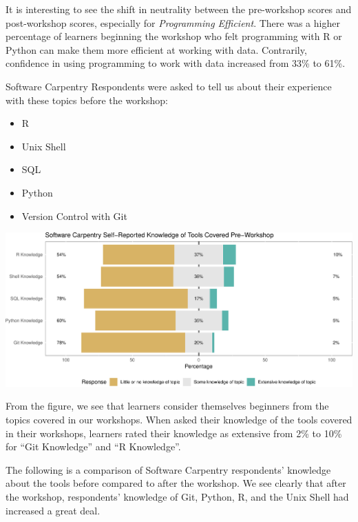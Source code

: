 \documentclass[]{article}
\makeatletter
\def\maxwidth{\ifdim\Gin@nat@width>\linewidth\linewidth\else\Gin@nat@width\fi}
\providecommand{\tightlist}{%
  \setlength{\itemsep}{0pt}\setlength{\parskip}{0pt}}
\makeatother
\begin{document}
It is interesting to see the shift in neutrality between the
pre-workshop scores and post-workshop scores, especially for
\emph{Programming Efficient}. There was a higher percentage of learners
beginning the workshop who felt programming with R or Python can make
them more efficient at working with data. Contrarily, confidence in
using programming to work with data increased from 33\% to 61\%.

Software Carpentry Respondents were asked to tell us about their
experience with these topics before the workshop:

\begin{itemize}
\tightlist
\item
  R
\item
  Unix Shell
\item
  SQL
\item
  Python
\item
  Version Control with Git
\end{itemize}

\includegraphics[width=\maxwidth]{../figures/swc-pre-tools-1}

From the figure, we see that learners consider themselves beginners from
the topics covered in our workshops. When asked their knowledge of the
tools covered in their workshops, learners rated their knowledge as
extensive from 2\% to 10\% for ``Git Knowledge'' and ``R Knowledge''.

The following is a comparison of Software Carpentry respondents'
knowledge about the tools before compared to after the workshop. We see
clearly that after the workshop, respondents' knowledge of Git, Python,
R, and the Unix Shell had increased a great deal.
\end{document}
